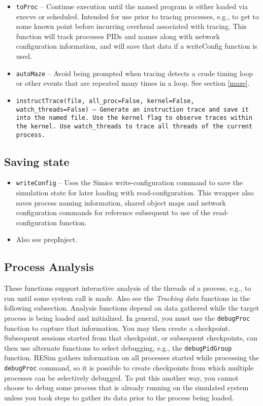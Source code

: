 \documentclass[titlepage]{article}
\begin{document}
\begin{itemize}
\item {\tt toProc} – Continue execution until the named program is either loaded via execve or scheduled.  Intended for use prior to tracing processes, e.g., to get to some known point before incurring overhead associated with tracing.   This function will track processes PIDs and names along with network configuration information, and will save that data if a writeConfig function is used.

\item {\tt autoMaze} -- Avoid being prompted when tracing detects a crude timing loop or other events that are repeated many times in a loop.
See section \ref{maze}.

\item {\tt instructTrace(file, all\_proc=False, kernel=False, watch\_threads=False) -- Generate an instruction trace and save it into the named file. Use the kernel
flag to observe traces within the kernel. Use {\tt watch\_threads} to trace all threads of the current process.}
\end{itemize}


\subsection{Saving state}
\begin{itemize}
\item {\tt writeConfig} – Uses the Simics write-configuration command to save the simulation state for later loading with read-configuration.  This wrapper also saves process naming information, shared object maps and network configuration commands for reference subsequent to use of the read-configuration function.
\item Also see prepInject.
\end{itemize}

\subsection{Process Analysis}
These functions support interactive analysis of the threads of a process, e.g., to run until some system call is made.  Also see the \textit{Tracking data} functions
in the following subsection.  Analysis functions depend on data gathered while the target process is being loaded and initialized.  In general, you
must use the {\tt debugProc} function to capture that information.  You may then create a checkpoint.  Subsequent sessions started from that checkpoint,
or subsequent checkpoints, can then use alternate functions to select debugging, e.g., the {\tt debugPidGroup} function. RESim gathers information on
all processes started while processing the {\tt debugProc} command, so it is possible to create checkpoints from which multiple processes can be selectively
debugged.  To put this another way, you cannot choose to debug some process that is already running on the simulated system unless you took steps to
gather its data prior to the process being loaded.
\end{document}
